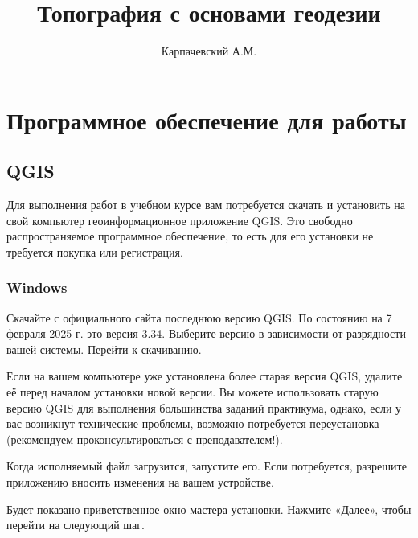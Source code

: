 \documentclass[
  russian,
  letterpaper,
  DIV=11,
  numbers=noendperiod]{scrreprt}
\title{Топография с основами геодезии}
\author{Карпачевский А.М.}
\date{}
\renewcommand*\contentsname{Содержание}
\newcommand\contentsname{Содержание}
\begin{document}
\maketitle

\renewcommand*\contentsname{Содержание}
{
\hypersetup{linkcolor=}
\setcounter{tocdepth}{2}
\tableofcontents
}


\chapter{Программное обеспечение для
работы}\label{ux43fux440ux43eux433ux440ux430ux43cux43cux43dux43eux435-ux43eux431ux435ux441ux43fux435ux447ux435ux43dux438ux435-ux434ux43bux44f-ux440ux430ux431ux43eux442ux44b}

\section*{QGIS}\label{qgis}


Для выполнения работ в учебном курсе вам потребуется скачать и
установить на свой компьютер геоинформационное приложение QGIS. Это
свободно распространяемое программное обеспечение, то есть для его
установки не требуется покупка или регистрация.

\subsection*{Windows}\label{windows}

Скачайте с официального сайта последнюю версию QGIS. По состоянию на 7
февраля 2025 г. это версия 3.34. Выберите версию в зависимости от
разрядности вашей системы.
\href{https://download.osgeo.org/qgis/windows/QGIS-OSGeo4W-3.34.15-1.msi}{Перейти
к скачиванию}.

Если на вашем компьютере уже установлена более старая версия QGIS,
удалите её перед началом установки новой версии. Вы можете использовать
старую версию QGIS для выполнения большинства заданий практикума,
однако, если у вас возникнут технические проблемы, возможно потребуется
переустановка (рекомендуем проконсультироваться с преподавателем!).

Когда исполняемый файл загрузится, запустите его. Если потребуется,
разрешите приложению вносить изменения на вашем устройстве.

Будет показано приветственное окно мастера установки. Нажмите «Далее»,
чтобы перейти на следующий шаг.
\end{document}
